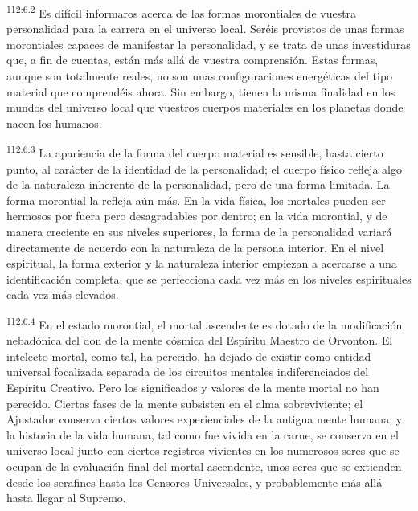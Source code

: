 \par
\textsuperscript{112:6.2} Es difícil informaros acerca de las formas morontiales de vuestra personalidad para la carrera en el universo local. Seréis provistos de unas formas morontiales capaces de manifestar la personalidad, y se trata de unas investiduras que, a fin de cuentas, están más allá de vuestra comprensión. Estas formas, aunque son totalmente reales, no son unas configuraciones energéticas del tipo material que comprendéis ahora. Sin embargo, tienen la misma finalidad en los mundos del universo local que vuestros cuerpos materiales en los planetas donde nacen los humanos.

\par
\textsuperscript{112:6.3} La apariencia de la forma del cuerpo material es sensible, hasta cierto punto, al carácter de la identidad de la personalidad; el cuerpo físico refleja algo de la naturaleza inherente de la personalidad, pero de una forma limitada. La forma morontial la refleja aún más. En la vida física, los mortales pueden ser hermosos por fuera pero desagradables por dentro; en la vida morontial, y de manera creciente en sus niveles superiores, la forma de la personalidad variará directamente de acuerdo con la naturaleza de la persona interior. En el nivel espiritual, la forma exterior y la naturaleza interior empiezan a acercarse a una identificación completa, que se perfecciona cada vez más en los niveles espirituales cada vez más elevados.

\par
\textsuperscript{112:6.4} En el estado morontial, el mortal ascendente es dotado de la modificación nebadónica del don de la mente cósmica del Espíritu Maestro de Orvonton. El intelecto mortal, como tal, ha perecido, ha dejado de existir como entidad universal focalizada separada de los circuitos mentales indiferenciados del Espíritu Creativo. Pero los significados y valores de la mente mortal no han perecido. Ciertas fases de la mente subsisten en el alma sobreviviente; el Ajustador conserva ciertos valores experienciales de la antigua mente humana; y la historia de la vida humana, tal como fue vivida en la carne, se conserva en el universo local junto con ciertos registros vivientes en los numerosos seres que se ocupan de la evaluación final del mortal ascendente, unos seres que se extienden desde los serafines hasta los Censores Universales, y probablemente más allá hasta llegar al Supremo.

